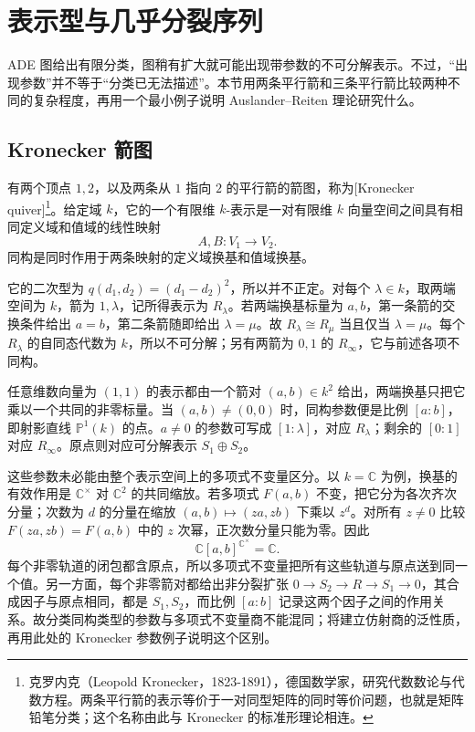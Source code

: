 \section{表示型与几乎分裂序列}
\label{b5:sec:1004}

ADE 图给出有限分类，图稍有扩大就可能出现带参数的不可分解表示。不过，“出现参数”并不等于“分类已无法描述”。本节用两条平行箭和三条平行箭比较两种不同的复杂程度，再用一个最小例子说明 Auslander--Reiten 理论研究什么。

\subsection{Kronecker 箭图}
\label{b5:subsec:1004:01}

\begin{definition}\label{b5:def:kronecker-quiver}
	有两个顶点 \(1,2\)，以及两条从 \(1\) 指向 \(2\) 的平行箭的箭图，称为[Kronecker quiver]\footnote{克罗内克（Leopold Kronecker，1823-1891），德国数学家，研究代数数论与代数方程。两条平行箭的表示等价于一对同型矩阵的同时等价问题，也就是矩阵铅笔分类；这个名称由此与 Kronecker 的标准形理论相连。}。给定域 \(k\)，它的一个有限维 \(k\)-表示是一对有限维 \(k\) 向量空间之间具有相同定义域和值域的线性映射
	\[
		A,B:V_1\longrightarrow V_2.
	\]
	同构是同时作用于两条映射的定义域换基和值域换基。
\end{definition}

它的二次型为 \(q(d_1,d_2)=(d_1-d_2)^2\)，所以并不正定。对每个 \(\lambda\in k\)，取两端空间为 \(k\)，箭为 \(1,\lambda\)，记所得表示为 \(R_\lambda\)。若两端换基标量为 \(a,b\)，第一条箭的交换条件给出 \(a=b\)，第二条箭随即给出 \(\lambda=\mu\)。故 \(R_\lambda\cong R_\mu\) 当且仅当 \(\lambda=\mu\)。每个 \(R_\lambda\) 的自同态代数为 \(k\)，所以不可分解；另有两箭为 \(0,1\) 的 \(R_\infty\)，它与前述各项不同构。

任意维数向量为 \((1,1)\) 的表示都由一个箭对 \((a,b)\in k^2\) 给出，两端换基只把它乘以一个共同的非零标量。当 \((a,b)\ne(0,0)\) 时，同构参数便是比例 \([a:b]\)，即射影直线 \(\mathbb P^1(k)\) 的点。\(a\ne0\) 的参数可写成 \([1:\lambda]\)，对应 \(R_\lambda\)；剩余的 \([0:1]\) 对应 \(R_\infty\)。原点则对应可分解表示 \(S_1\oplus S_2\)。

这些参数未必能由整个表示空间上的多项式不变量区分。以 \(k=\mathbb C\) 为例，换基的有效作用是 \(\mathbb C^\times\) 对 \(\mathbb C^2\) 的共同缩放。若多项式 \(F(a,b)\) 不变，把它分为各次齐次分量；次数为 \(d\) 的分量在缩放 \((a,b)\mapsto(za,zb)\) 下乘以 \(z^d\)。对所有 \(z\ne0\) 比较 \(F(za,zb)=F(a,b)\) 中的 \(z\) 次幂，正次数分量只能为零。因此
\[
	\mathbb C[a,b]^{\mathbb C^\times}=\mathbb C.
\]
每个非零轨道的闭包都含原点，所以多项式不变量把所有这些轨道与原点送到同一个值。另一方面，每个非零箭对都给出非分裂扩张 \(0\to S_2\to R\to S_1\to0\)，其合成因子与原点相同，都是 \(S_1,S_2\)，而比例 \([a:b]\) 记录这两个因子之间的作用关系。故分类同构类型的参数与多项式不变量商不能混同；将建立仿射商的泛性质，再用此处的 Kronecker 参数例子说明这个区别。

